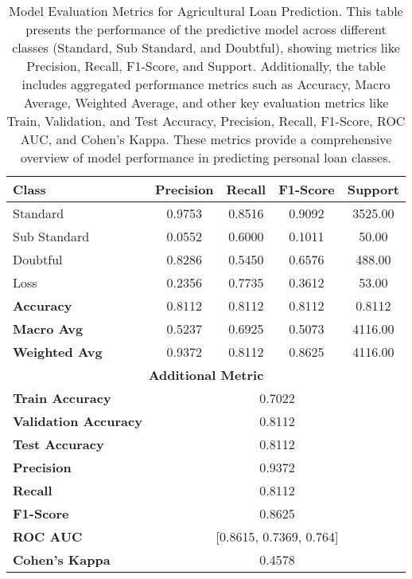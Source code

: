 \documentclass[a4paper]{article}
\begin{document}
\begin{table}[h]
	\centering
	\begin{minipage}{0.8\textwidth}
	\caption{Model Evaluation Metrics for Agricultural Loan Prediction. This table presents the performance of the predictive model across different classes (Standard, Sub Standard, and Doubtful), showing metrics like Precision, Recall, F1-Score, and Support. Additionally, the table includes aggregated performance metrics such as Accuracy, Macro Average, Weighted Average, and other key evaluation metrics like Train, Validation, and Test Accuracy, Precision, Recall, F1-Score, ROC AUC, and Cohen's Kappa. These metrics provide a comprehensive overview of model performance in predicting personal loan classes.}
	\begin{tabular}{|l|c|c|c|c|}
		\hline
		\textbf{Class} & \textbf{Precision} & \textbf{Recall} & \textbf{F1-Score} & \textbf{Support} \\ 
		\hline
		Standard       & 0.9753           & 0.8516        & 0.9092          & 3525.00      \\ 
		Sub Standard   & 0.0552           & 0.6000        & 0.1011          & 50.00        \\ 
		Doubtful       & 0.8286           & 0.5450        & 0.6576          & 488.00       \\ 
		Loss           & 0.2356           & 0.7735        & 0.3612          & 53.00        \\ 
		\hline
		\textbf{Accuracy}        & 0.8112 & 0.8112 & 0.8112 & 0.8112 \\ 
		\textbf{Macro Avg}      & 0.5237 & 0.6925 & 0.5073 & 4116.00 \\ 
		\textbf{Weighted Avg}   & 0.9372 & 0.8112 & 0.8625 & 4116.00 \\ 
		\hline
		\multicolumn{5}{|c|}{\textbf{Additional Metric}}  \\
		\hline
		\textbf{Train Accuracy}            & \multicolumn{4}{c|}{0.7022} \\ 
		\textbf{Validation Accuracy}       & \multicolumn{4}{c|}{0.8112} \\ 
		\textbf{Test Accuracy}             & \multicolumn{4}{c|}{0.8112} \\ 
		\textbf{Precision}                 & \multicolumn{4}{c|}{0.9372} \\ 
		\textbf{Recall}                    & \multicolumn{4}{c|}{0.8112} \\ 
		\textbf{F1-Score}                  & \multicolumn{4}{c|}{0.8625} \\ 
		\textbf{ROC AUC}                   & \multicolumn{4}{c|}{[0.8615, 0.7369, 0.764]} \\ 
		\textbf{Cohen’s Kappa}             & \multicolumn{4}{c|}{0.4578} \\ 
		\hline
	\end{tabular}
	\label{tab:model_metrics_agri}
\end{minipage}
\end{table} 
\end{document}

